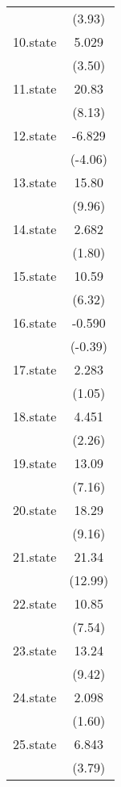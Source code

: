 {\begin{tabular}{l*{1}{c}}
            &      (3.93)         \\
[1em]
10.state    &       5.029\sym{***}\\
            &      (3.50)         \\
[1em]
11.state    &       20.83\sym{***}\\
            &      (8.13)         \\
[1em]
12.state    &      -6.829\sym{***}\\
            &     (-4.06)         \\
[1em]
13.state    &       15.80\sym{***}\\
            &      (9.96)         \\
[1em]
14.state    &       2.682         \\
            &      (1.80)         \\
[1em]
15.state    &       10.59\sym{***}\\
            &      (6.32)         \\
[1em]
16.state    &      -0.590         \\
            &     (-0.39)         \\
[1em]
17.state    &       2.283         \\
            &      (1.05)         \\
[1em]
18.state    &       4.451\sym{*}  \\
            &      (2.26)         \\
[1em]
19.state    &       13.09\sym{***}\\
            &      (7.16)         \\
[1em]
20.state    &       18.29\sym{***}\\
            &      (9.16)         \\
[1em]
21.state    &       21.34\sym{***}\\
            &     (12.99)         \\
[1em]
22.state    &       10.85\sym{***}\\
            &      (7.54)         \\
[1em]
23.state    &       13.24\sym{***}\\
            &      (9.42)         \\
[1em]
24.state    &       2.098         \\
            &      (1.60)         \\
[1em]
25.state    &       6.843\sym{***}\\
            &      (3.79)         \\

\end{tabular}}
